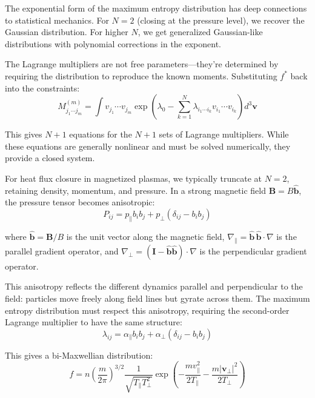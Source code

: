 \documentclass[12pt,a4paper]{article}
\newcommand{\vect}[1]{\mathbf{#1}}
\begin{document}
The exponential form of the maximum entropy distribution has deep connections to statistical mechanics. For $N=2$ (closing at the pressure level), we recover the Gaussian distribution. For higher $N$, we get generalized Gaussian-like distributions with polynomial corrections in the exponent.

The Lagrange multipliers are not free parameters—they're determined by requiring the distribution to reproduce the known moments. Substituting $f^*$ back into the constraints:
\begin{equation}
M_{j_1 \cdots j_m}^{(m)} = \int v_{j_1} \cdots v_{j_m} \exp\left(\lambda_0 - \sum_{k=1}^N \lambda_{i_1 \cdots i_k} v_{i_1} \cdots v_{i_k}\right) d^3\vect{v}
\label{eq:moment_determination}
\end{equation}

This gives $N+1$ equations for the $N+1$ sets of Lagrange multipliers. While these equations are generally nonlinear and must be solved numerically, they provide a closed system.

For heat flux closure in magnetized plasmas, we typically truncate at $N=2$, retaining density, momentum, and pressure. In a strong magnetic field $\vect{B} = B\hat{\vect{b}}$, the pressure tensor becomes anisotropic:
\begin{equation}
P_{ij} = p_\parallel b_i b_j + p_\perp (\delta_{ij} - b_i b_j)
\label{eq:pressure_anisotropy}
\end{equation}

where $\hat{\vect{b}} = \vect{B}/B$ is the unit vector along the magnetic field, $\nabla_\parallel = \hat{\vect{b}}\,\hat{\vect{b}} \cdot \nabla$ is the parallel gradient operator, and $\nabla_\perp = (\mathbf{I} - \hat{\vect{b}}\hat{\vect{b}}) \cdot \nabla$ is the perpendicular gradient operator.

This anisotropy reflects the different dynamics parallel and perpendicular to the field: particles move freely along field lines but gyrate across them. The maximum entropy distribution must respect this anisotropy, requiring the second-order Lagrange multiplier to have the same structure:
\begin{equation}
\lambda_{ij} = \alpha_\parallel b_i b_j + \alpha_\perp (\delta_{ij} - b_i b_j)
\label{eq:lagrange_anisotropy}
\end{equation}

This gives a bi-Maxwellian distribution:
\begin{equation}
f = n\left(\frac{m}{2\pi}\right)^{3/2} \frac{1}{\sqrt{T_\parallel T_\perp^2}} \exp\left(-\frac{m v_\parallel^2}{2T_\parallel} - \frac{m|\vect{v}_\perp|^2}{2T_\perp}\right)
\label{eq:bi_maxwellian}
\end{equation}
\end{document}
